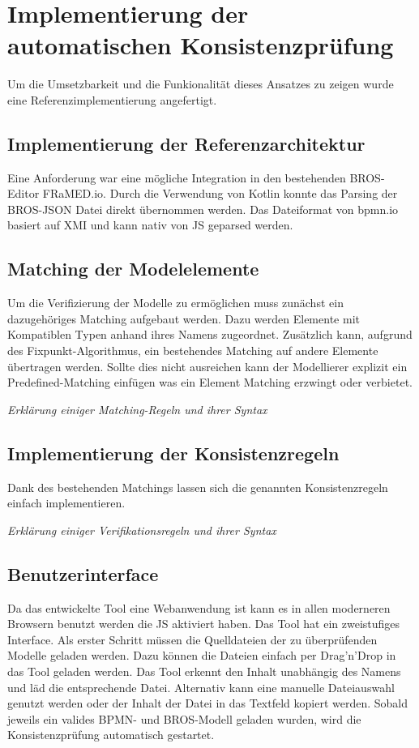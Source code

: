 \chapter{Implementierung der automatischen Konsistenzprüfung}

Um die Umsetzbarkeit und die Funkionalität dieses Ansatzes zu zeigen wurde eine Referenzimplementierung angefertigt. 

\section{Implementierung der Referenzarchitektur}

Eine Anforderung war eine mögliche Integration in den bestehenden BROS-Editor FRaMED.io.
Durch die Verwendung von Kotlin konnte das Parsing der BROS-JSON Datei direkt übernommen werden.
Das Dateiformat von bpmn.io basiert auf XMI und kann nativ von JS geparsed werden.

\section{Matching der Modelelemente}

Um die Verifizierung der Modelle zu ermöglichen muss zunächst ein dazugehöriges Matching aufgebaut werden.
Dazu werden Elemente mit Kompatiblen Typen anhand ihres Namens zugeordnet.
Zusätzlich kann, aufgrund des Fixpunkt-Algorithmus, ein bestehendes Matching auf andere Elemente übertragen werden.
Sollte dies nicht ausreichen kann der Modellierer explizit ein Predefined-Matching einfügen was ein Element Matching erzwingt oder verbietet.

\textit{Erklärung einiger Matching-Regeln und ihrer Syntax}

\section{Implementierung der Konsistenzregeln}

Dank des bestehenden Matchings lassen sich die genannten Konsistenzregeln einfach implementieren.

\textit{Erklärung einiger Verifikationsregeln und ihrer Syntax}

\section{Benutzerinterface}

Da das entwickelte Tool eine Webanwendung ist kann es in allen moderneren Browsern benutzt werden die JS aktiviert haben.
Das Tool hat ein zweistufiges Interface.
Als erster Schritt müssen die Quelldateien der zu überprüfenden Modelle geladen werden.
Dazu können die Dateien einfach per Drag'n'Drop in das Tool geladen werden.
Das Tool erkennt den Inhalt unabhängig des Namens und läd die entsprechende Datei.
Alternativ kann eine manuelle Dateiauswahl genutzt werden oder der Inhalt der Datei in das Textfeld kopiert werden.
Sobald jeweils ein valides BPMN- und BROS-Modell geladen wurden, wird die Konsistenzprüfung automatisch gestartet.

